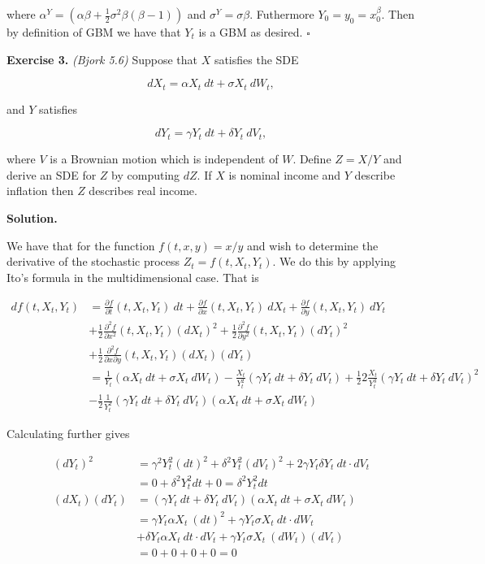 \documentclass[
]{book}
\begin{document}
where \(\alpha^Y=\left(\alpha \beta+\frac{1}{2}\sigma ^2\beta (\beta -1)\right)\) and \(\sigma^Y =\sigma \beta\). Futhermore \(Y_0=y_0=x_0^\beta\). Then by definition of GBM we have that \(Y_t\) is a GBM as desired. \(\square\)

\textbf{Exercise 3.} \emph{(Bjork 5.6)} Suppose that \(X\) satisfies the SDE

\[
dX_t = \alpha X_t\ dt + \sigma X_t\ dW_t,
\]

and \(Y\) satisfies

\[
dY_t = \gamma Y_t\ dt+\delta Y_t\ dV_t,
\]

where \(V\) is a Brownian motion which is independent of \(W\). Define \(Z=X/Y\) and derive an SDE for \(Z\) by computing \(dZ\). If \(X\) is nominal income and \(Y\) describe inflation then \(Z\) describes real income.

\textbf{Solution.}

We have that for the function \(f(t,x,y)=x/y\) and wish to determine the derivative of the stochastic process \(Z_t=f(t,X_t,Y_t)\). We do this by applying Ito's formula in the multidimensional case. That is

\begin{align*}
df(t,X_t,Y_t)&=\frac{\partial f}{\partial t}(t,X_t,Y_t)\ dt + \frac{\partial f}{\partial x}(t,X_t,Y_t)\ dX_t + \frac{\partial f}{\partial y}(t,X_t,Y_t)\ dY_t\\
&+\frac{1}{2}\frac{\partial^2 f}{\partial x^2}(t,X_t,Y_t)(dX_t)^2 + \frac{1}{2}\frac{\partial^2 f}{\partial y^2}(t,X_t,Y_t)(dY_t)^2\\
&+\frac{1}{2}\frac{\partial^2 f}{\partial x\partial y}(t,X_t,Y_t)(dX_t)(dY_t)\\
&=\frac{1}{Y_t}(\alpha X_t\ dt + \sigma X_t\ dW_t)-\frac{X_t}{Y_t^2}(\gamma Y_t\ dt+\delta Y_t\ dV_t)+\frac{1}{2}2\frac{X_t}{Y_t^3}(\gamma Y_t\ dt+\delta Y_t\ dV_t)^2\\
&-\frac{1}{2}\frac{1}{Y_t^2}(\gamma Y_t\ dt+\delta Y_t\ dV_t)(\alpha X_t\ dt + \sigma X_t\ dW_t)
\end{align*}

Calculating further gives

\begin{align*}
(dY_t)^2&=\gamma^2 Y_t^2 (dt)^2+\delta^2Y_t^2 (dV_t)^2+2\gamma Y_t\delta Y_t\ dt\cdot dV_t\\
&=0 +\delta^2Y_t^2 dt + 0=\delta^2Y_t^2 dt\\
(dX_t)(dY_t)&=(\gamma Y_t\ dt+\delta Y_t\ dV_t)(\alpha X_t\ dt + \sigma X_t\ dW_t)\\
&=\gamma Y_t \alpha X_t\ (dt)^2 +\gamma Y_t\sigma X_t\ dt\cdot dW_t\\
&+\delta Y_t \alpha X_t\ dt\cdot dV_t+\gamma Y_t\sigma X_t\ (dW_t)(dV_t)\\
&=0+0+0+0=0
\end{align*}
\end{document}

